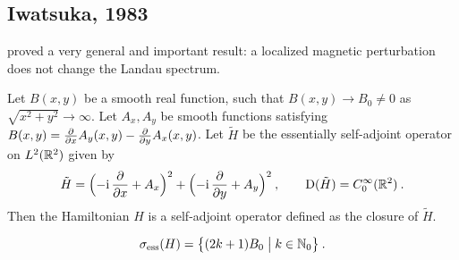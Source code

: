 \subsection{Iwatsuka, 1983}
\citet{Iwatsuka1983} proved a very general and important result: a localized magnetic perturbation does not change the Landau spectrum.
\begin{defn}
    Let $B(x, y)$ be a smooth real function, such that $B(x, y) \to B_0 \neq 0$ as $\sqrt{x^2 + y^2} \to \infty$. Let $A_x, A_y$ be smooth functions satisfying $B(x,y) = \frac{\partial }{\partial x} A_y(x,y) - \frac{\partial }{\partial y} A_x(x,y)$. Let $\tilde H$ be the essentially self-adjoint operator on $L^2(\mathbb{R}^2)$ given by
    \begin{gather*}
        \tilde H
        = \Big( {-\mathrm{i}} \, \frac{\partial }{\partial x} + A_x \Big)^2
        + \Big( {-\mathrm{i}} \, \frac{\partial }{\partial y} + A_y \Big)^2
        \: , \qquad
        \mathrm{D}(\tilde H) = C_0^\infty(\mathbb{R}^2)
        \: .
    \end{gather*}
    Then the Hamiltonian $H$ is a self-adjoint operator defined as the closure of $\tilde H$.
\end{defn}
\begin{thm}[Spectrum of $H$] \label{thm-Iwatsuka-unperturb}
    $$
        \sigma_{\mathrm{ess}}(H) = \big\{ (2k + 1) B_0  \;\big|\; k \in \mathbb{N}_0 \big\}
        \: .
    $$
\end{thm}

